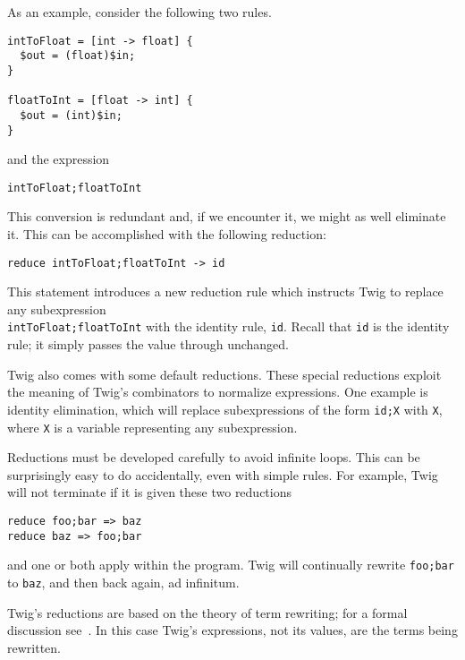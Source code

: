 As an example, consider the following two rules.

\begin{verbatim}
intToFloat = [int -> float] {
  $out = (float)$in;
}

floatToInt = [float -> int] {
  $out = (int)$in;
}
\end{verbatim}

and the expression

\begin{verbatim}
intToFloat;floatToInt
\end{verbatim}

This conversion is redundant and, if we encounter it, we might as well
eliminate it. This can be accomplished with the following reduction:

\begin{verbatim}
reduce intToFloat;floatToInt -> id
\end{verbatim}

This statement introduces a new reduction rule which instructs Twig to replace
any subexpression\\\texttt{intToFloat;floatToInt} with the identity rule,
\texttt{id}. Recall that \texttt{id} is the identity rule; it simply passes
the value through unchanged.

Twig also comes with some default reductions. These special reductions exploit
the meaning of Twig's combinators to normalize expressions. One example is
identity elimination, which will replace subexpressions of the form
\texttt{id;X} with \texttt{X}, where \texttt{X} is a variable representing any
subexpression.

Reductions must be developed carefully to avoid infinite loops. This can be
surprisingly easy to do accidentally, even with simple rules. For example, Twig
will not terminate if it is given these two reductions

\begin{verbatim}
reduce foo;bar => baz
reduce baz => foo;bar
\end{verbatim}

and one or both apply within the program. Twig will continually rewrite
\texttt{foo;bar} to \texttt{baz}, and then back again, ad infinitum.

Twig's reductions are based on the theory of term rewriting; for a formal
discussion see~\cite{baader98rewriting}. In this case Twig's expressions, not
its values, are the terms being rewritten.
